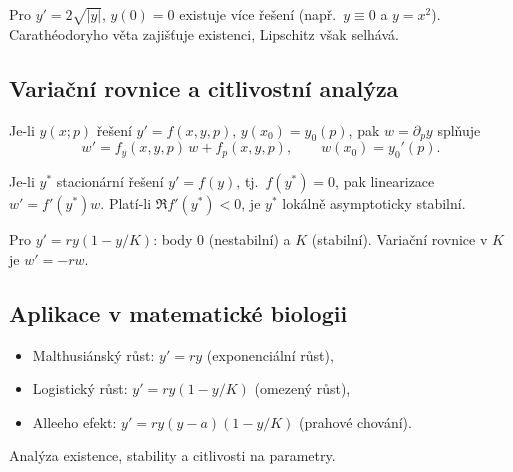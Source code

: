 \begin{example}
\label{ex:bez-uniqueness}
Pro $y'=2\sqrt{|y|}$, $y(0)=0$ existuje více řešení (např.\ $y\equiv0$ a $y=x^2$). Carathéodoryho věta zajišťuje existenci, Lipschitz však selhává.
\end{example}

\spc

\subsection{Variační rovnice a citlivostní analýza}
\label{sec:variacni-rovnice}

\begin{definition}
\label{def:variacni-rovnice}
Je-li $y(x;p)$ řešení $y'=f(x,y,p)$, $y(x_0)=y_0(p)$, pak $w=\partial_p y$ splňuje
\[
w'=f_y(x,y,p)\,w + f_p(x,y,p),\qquad w(x_0)=y_0'(p).
\]
\end{definition}

\begin{theorem}
\label{vet:linearizace-stabilita}
Je-li $y^\ast$ stacionární řešení $y'=f(y)$, tj.\ $f(y^\ast)=0$, pak linearizace $w'=f'(y^\ast)w$. 
Platí-li $\Re f'(y^\ast)<0$, je $y^\ast$ lokálně asymptoticky stabilní.
\end{theorem}

\begin{example}
\label{ex:logisticka-citlivost}
Pro $y'=r y(1-y/K)$: body $0$ (nestabilní) a $K$ (stabilní). Variační rovnice v $K$ je $w'=-r w$.
\end{example}

\spc

\subsection{Aplikace v matematické biologii}
\label{sec:aplikace-biologie}

\begin{example}
\label{ex:populacni-modely}
\begin{itemize}
\item Malthusiánský růst: $y'=ry$ (exponenciální růst),
\item Logistický růst: $y'=ry(1-y/K)$ (omezený růst),
\item Alleeho efekt: $y'=ry(y-a)(1-y/K)$ (prahové chování).
\end{itemize}
Analýza existence, stability a citlivosti na parametry.
\end{example}

